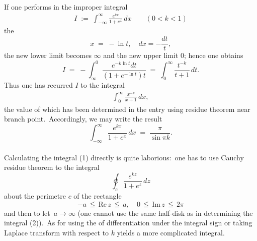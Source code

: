 \documentclass[12pt]{article}
\theoremstyle{definition}
\begin{document}
If one performs in the improper integral
\begin{align}
I \;:=\; \int_{-\infty}^\infty\frac{e^{kx}}{1\!+\!e^x}\,dx \qquad (0 < k < 1)
\end{align}
the 
$$x \;=\; -\ln{t}, \quad dx = -\frac{dt}{t},$$
the new lower limit becomes $\infty$ and the new upper limit 0; hence one obtains
$$I \;=\; -\int_\infty^0\frac{e^{-k\ln{t}}dt}{(1\!+\!e^{-\ln{t}})t} \;=\; \int_0^\infty\frac{t^{-k}}{t\!+\!1}\,dt.$$
Thus one has recurred $I$ to the integral
\begin{align}
\int_0^\infty\frac{x^{-k}}{x\!+\!1}\,dx,
\end{align}
the value of which has been determined in the entry using residue theorem near branch point.\, Accordingly, we may write the result
$$\int_{-\infty}^\infty\frac{e^{kx}}{1\!+\!e^x}\,dx \;=\; \frac{\pi}{\sin{\pi k}}.$$\\


Calculating the integral (1) directly is quite laborious:\, one has to use Cauchy residue theorem to the integral
$$\oint_c\frac{e^{kz}}{1\!+\!e^z}\,dz$$
about the perimetre $c$ of the rectangle 
$$-a \,\leqq\, \mbox{Re}\,z \,\leqq\, a, \quad 0 \,\leqq\, \mbox{Im}\,z \,\leqq\, 2\pi$$
and then to let\, $a \to \infty$ (one cannot use the same half-disk as in determining the integral (2)).\, As for using the  of differentiation under the integral sign or taking Laplace transform with respect to $k$ yields a more complicated integral.


\end{document}
